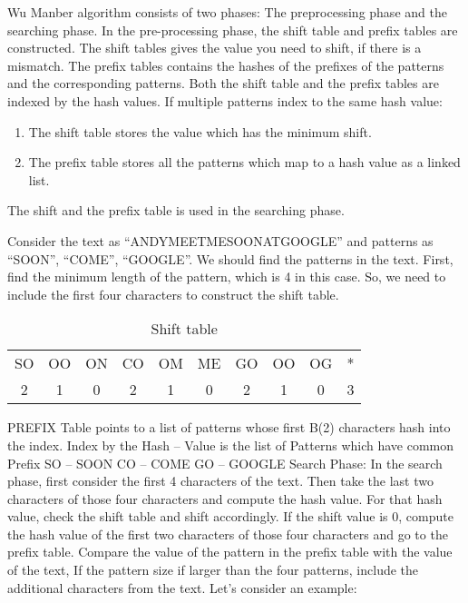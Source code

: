 Wu Manber algorithm consists of two phases: The preprocessing phase and the searching phase.
In the pre-processing phase, the shift table and prefix tables are constructed. The shift tables gives the value you need to shift, if there is a mismatch. The prefix tables contains the hashes of the prefixes of the patterns and the corresponding patterns.
Both the shift table and the prefix tables are indexed by the hash values. If multiple patterns index to the same hash value:

\begin{enumerate}
	\item The shift table stores the value which has the minimum shift.
	\item The prefix table stores all the patterns which map to a hash value as a linked list.
\end{enumerate}

The shift and the prefix table is used in the searching phase.

Consider the text as “ANDYMEETMESOONATGOOGLE” and patterns as “SOON”, “COME”, “GOOGLE”. We should find the patterns in the text.
First, find the minimum length of the pattern, which is 4 in this case. So, we need to include the first four characters to construct the shift table.

\begin {table}[h]
\caption {Shift table} \label{tab:title} 
\begin{tabular}{|c|c|c|c|c|c|c|c|c|c|} 
	\midrule
	SO &	OO &	ON &	CO &	OM &	ME &	GO &	OO &	OG   &	* \\
	2 & 1 & 0 & 2 & 1 & 0 & 2 & 1 & 0  & 3\\
	\midrule
\end{tabular}
\end{table}


PREFIX Table points to a list of patterns whose first B(2) characters hash into the index.
Index by the Hash – Value is the list of Patterns which have common Prefix
SO – SOON
CO – COME
GO – GOOGLE
Search Phase:
In the search phase, first consider the first 4 characters of the text. Then take the last two characters of those four characters and compute the hash value. For that hash value, check the shift table and shift accordingly. If the shift value is 0, compute the hash value of the first two characters of those four characters and go to the prefix table. Compare the value of the pattern in the prefix table with the value of the text, If the pattern size if larger than the four patterns, include the additional characters from the text.
Let’s consider an example:

